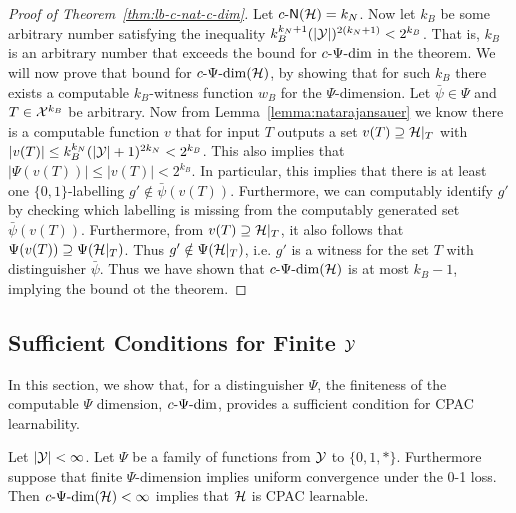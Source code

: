 \documentclass[11pt]{article}
\begin{document}
\begin{proof}[Proof of Theorem~\ref{thm:lb-c-nat-c-dim}]
    Let $c\text{-}\mathsf{N}(\mathcal{H}) =k_N$. Now let $k_B$ be some arbitrary number satisfying the inequality $k_B^{k_N + 1} (|\mathcal{Y}|)^{2(k_N +1)}  < 2^{k_B}$. That is, $k_B$ is an arbitrary number that exceeds the bound for $c\text{-}\Psi\text{-}\mathrm{dim}$ in the theorem.
    We will now prove that bound for $c\text{-}\Psi\text{-}\mathrm{dim}(\mathcal{H})$, by showing that for such $k_B$ there exists a computable $k_B$-witness function $w_B$ for the $\Psi$-dimension. %
  Let $\bar{\psi}\in \Psi$ and $T\in \mathcal{X}^{k_B}$ be arbitrary.
   Now from Lemma~\ref{lemma:natarajansauer} we know there is a computable function $v$ that for input $T$  
    outputs a set $v(T)\supseteq \mathcal{H}|_T$ with  $|v(T)| \leq k_B^{k_N}(|\mathcal{Y}|+1)^{2k_N} < 2^{k_B}$. This also implies that $|\Psi(v(T))|\leq |v(T)| < 2^{k_B} $.
     In particular, this implies that there is at least one $\{0,1\}$-labelling $g'\not\in \bar{\psi}(v(T))$. Furthermore, we can computably identify $g'$ by checking which labelling is missing from the computably generated set $\bar{\psi}(v(T))$.
     Furthermore, from $v(T) \supseteq \mathcal{H}|_T$, it also follows that $\Psi(v(T)) \supseteq \Psi(\mathcal{H}|_T)$. 
    Thus $g'\notin \Psi(\mathcal{H}|_T)$, i.e. $g'$ is a witness for the set $T$ with distinguisher $\bar{\psi}$. Thus we have shown that $c\text{-}\Psi\text{-}\mathrm{dim}(\mathcal{H})$ is at most $k_B-1$, implying the bound ot the theorem.
       \end{proof}

\subsection{Sufficient Conditions for Finite $\mathcal{Y}$}

In this section, we show that, for a distinguisher $\Psi$, the finiteness of the computable $\Psi$ dimension, $c\text{-}\Psi\text{-}\mathrm{dim}$, provides a sufficient condition for CPAC learnability.

\begin{theorem}
\label{thm:finite-y+psi-uc=>cpac}
    Let $|\mathcal{Y}|<\infty$.
    Let $\Psi$ be a family of functions from $\mathcal{Y}$ to $\{0,1,*\}$.
    Furthermore suppose that finite $\Psi$-dimension implies uniform convergence under the 0-1 loss.
    Then $c\text{-}\Psi\text{-}\mathrm{dim}(\mathcal{H})<\infty$ implies that $\mathcal{H}$ is CPAC learnable.
\end{theorem}
\end{document}
